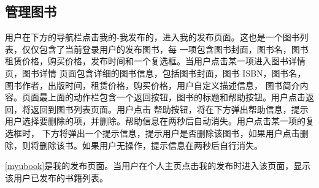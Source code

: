 \subsection{管理图书}
用户在下方的导航栏点击我的-我发布的，进入我的发布页面。这也是一个图书列表，仅仅包含了当前登录用户的发布图书，每
一项包含图书封面，图书名，图书租赁价格，购买价格，发布时间和一个复选框。当用户点击某一项进入图书详情页，图书详情
页面包含详细的图书信息，包括图书封面，图书 ISBN，图书名，图书作者，出版时间，租赁价格，购买价格，用户自定义描述信息，
图书简介内容。页面最上面的动作栏包含一个返回按钮，图书的标题和帮助按钮。用户点击返回，将返回到图书列表页面。用户点击
帮助按钮，将在下方弹出帮助信息，提示用户选择要删除的项，并删除。帮助信息在两秒后自动消失。用户点击某一项的复选框时，
下方将弹出一个提示信息，提示用户是否删除该图书，如果用户点击删除，则将删除该书。如果用户无操作，提示信息在两秒后自行消失。

\cref{myubook}是我的发布页面。当用户在个人主页点击我的发布时进入该页面，显示该用户已发布的书籍列表。

